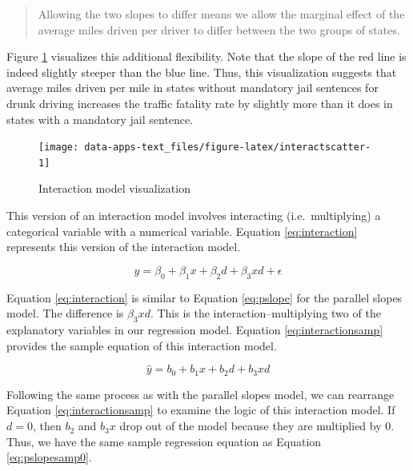 \documentclass[
]{book}
\begin{document}
\begin{quote}
Allowing the two slopes to differ means we allow the marginal effect of the average miles driven per driver to differ between the two groups of states.
\end{quote}

Figure \ref{fig:interactscatter} visualizes this additional flexibility. Note that the slope of the red line is indeed slightly steeper than the blue line. Thus, this visualization suggests that average miles driven per mile in states without mandatory jail sentences for drunk driving increases the traffic fatality rate by slightly more than it does in states with a mandatory jail sentence.

\begin{figure}

{\centering \texttt{[image: data-apps-text\_files/figure-latex/interactscatter-1]} 

}

\caption{Interaction model visualization}\label{fig:interactscatter}
\end{figure}

This version of an interaction model involves interacting (i.e.~multiplying) a categorical variable with a numerical variable. Equation \eqref{eq:interaction} represents this version of the interaction model.

\begin{equation}
y = \beta_0 + \beta_1x + \beta_2d + \beta_3xd + \epsilon
\label{eq:interaction}
\end{equation}

Equation \eqref{eq:interaction} is similar to Equation \eqref{eq:pslope} for the parallel slopes model. The difference is \(\beta_3xd\). This is the interaction--multiplying two of the explanatory variables in our regression model. Equation \eqref{eq:interactionsamp} provides the sample equation of this interaction model.

\begin{equation}
\hat{y} = b_0 + b_1x + b_2d + b_3xd
\label{eq:interactionsamp}
\end{equation}

Following the same process as with the parallel slopes model, we can rearrange Equation \eqref{eq:interactionsamp} to examine the logic of this interaction model. If \(d=0\), then \(b_2\) and \(b_3x\) drop out of the model because they are multiplied by 0. Thus, we have the same sample regression equation as Equation \eqref{eq:pslopesamp0}.
\end{document}
